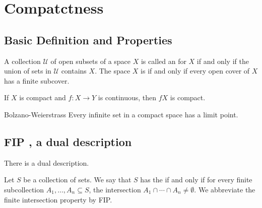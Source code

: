 \documentclass[../main.tex]{subfiles}
\begin{document}
\ifSubfilesClassLoaded{

    
}{}

\chapter{ Compatctness }

\section{Basic Definition and Properties}
\begin{definition}{}{}
A collection $\mathcal{U}$ of open subsets of a space $X$ is called an  for $X$ if and only if the union of sets in $\mathcal{U}$ contains $X$. The space $X$ is  if and only if every open cover of $X$ has a finite subcover.
\end{definition}

\begin{theorem}{}{}
If $X$ is compact and $f: X \to Y$ is continuous, then $fX$ is compact.
\end{theorem}

\begin{theorem}{Bolzano-Weierstrass}{}
Every infinite set in a compact space has a limit point.
\end{theorem}

\section{FIP ,  a dual description}
There is a dual description.
\begin{definition}{}{}
Let $S$ be a collection of sets. We say that $S$ has the  if and only if for every finite subcollection $A_1, \dots, A_n \subseteq S$, the intersection $A_1 \cap \cdots \cap A_n \neq \emptyset$. We abbreviate the finite intersection property by FIP.
\end{definition}
\end{document}

